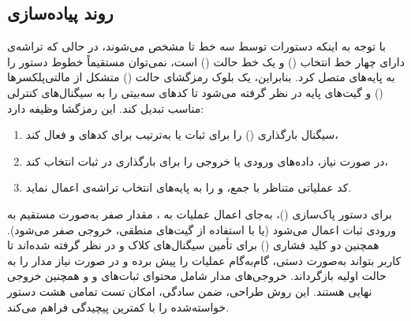 \documentclass[a4paper,12pt]{article}
\numberwithin{figure}{subsection}
\begin{document}
\subsection{روند پیاده‌سازی}
\leavevmode\par
\vspace{0.3cm}

با توجه به اینکه دستورات توسط سه خط  تا  مشخص می‌شوند، در حالی که تراشه‌ی  دارای چهار خط انتخاب () و یک خط حالت () است، نمی‌توان مستقیماً خطوط دستور را به پایه‌های  متصل کرد. بنابراین، یک بلوک رمزگشای حالت () متشکل از مالتی‌پلکسرها () و گیت‌های پایه در نظر گرفته می‌شود تا کدهای سه‌بیتی را به سیگنال‌های کنترلی مناسب تبدیل کند. این رمزگشا وظیفه دارد: 
\begin{enumerate}
    \item سیگنال بارگذاری () را برای ثبات  یا  به‌ترتیب برای کدهای  و  فعال کند،
    \item در صورت نیاز، داده‌های ورودی  یا خروجی  را برای بارگذاری در ثبات  انتخاب کند،
    \item کد عملیاتی متناظر با جمع،  و  را به پایه‌های انتخاب تراشه‌ی  اعمال نماید.
\end{enumerate}

برای دستور پاک‌سازی ()، به‌جای اعمال عملیات به ، مقدار صفر به‌صورت مستقیم به ورودی ثبات  اعمال می‌شود (یا با استفاده از گیت‌های منطقی، خروجی  صفر می‌شود). همچنین دو کلید فشاری () برای تأمین سیگنال‌های کلاک و  در نظر گرفته شده‌اند تا کاربر بتواند به‌صورت دستی، گام‌به‌گام عملیات را پیش برده و در صورت نیاز مدار را به حالت اولیه بازگرداند. خروجی‌های مدار شامل محتوای ثبات‌های  و  و همچنین خروجی نهایی  هستند. این روش طراحی، ضمن سادگی، امکان تست تمامی هشت دستور خواسته‌شده را با کمترین پیچیدگی فراهم می‌کند.
\end{document}

